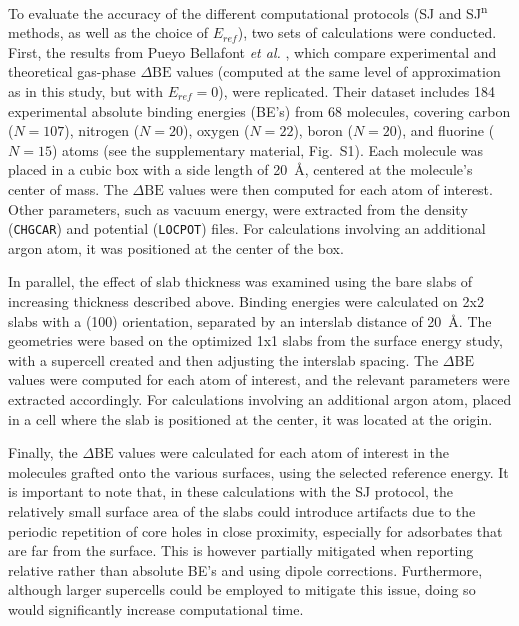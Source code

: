 \documentclass[%
aip,
amsmath,amssymb,
preprint,%
jcp,
showkeys,
]{revtex4-2}
\def\dbe{\ensuremath{\Delta\text{BE}}}
\begin{document}
To evaluate the accuracy of the different computational protocols (SJ and SJ\textsuperscript{n} methods, as well as the choice of $E_{ref}$), two sets of calculations were conducted. First, the results from Pueyo Bellafont \textit{et al.} \cite{pueyobellafontPredictingCoreLevel2017}, which compare experimental and theoretical gas-phase \dbe{} values (computed at the same level of approximation as in this study, but with $E_{ref}=0$), were replicated. Their dataset includes 184 experimental absolute binding energies (BE's) from 68 molecules, covering carbon ($N=107$), nitrogen ($N=20$), oxygen ($N=22$), boron ($N=20$), and fluorine ($N=15$) atoms (see the supplementary material, Fig.~S1). Each molecule was placed in a cubic box with a side length of \SI{20}{\angstrom}, centered at the molecule's center of mass. The \dbe{} values were then computed for each atom of interest. Other parameters, such as vacuum energy, were extracted from the density (\texttt{CHGCAR}) and potential (\texttt{LOCPOT}) files. For calculations involving an additional argon atom, it was positioned at the center of the box.

In parallel, the effect of slab thickness was examined using the bare slabs of increasing thickness described above. Binding energies were calculated on 2x2 slabs with a (100) orientation, separated by an interslab distance of \SI{20}{\angstrom}. The geometries were based on the optimized 1x1 slabs from the surface energy study, with a supercell created and then adjusting the interslab spacing. The \dbe{} values were computed for each atom of interest, and the relevant parameters were extracted accordingly. For calculations involving an additional argon atom, placed in a cell where the slab is positioned at the center, it was located at the origin.

Finally, the \dbe{} values were calculated for each atom of interest in the molecules grafted onto the various surfaces, using the selected reference energy. It is important to note that, in these calculations with the SJ protocol, the relatively small surface area of the slabs could introduce artifacts due to the periodic repetition of core holes in close proximity, especially for adsorbates that are far from the surface.\cite{taucherFinalStateSimulationsCoreLevel2020} This is however partially mitigated when reporting relative rather than absolute BE's and using dipole corrections. Furthermore, although larger supercells could be employed to mitigate this issue, doing so would significantly increase computational time.
\end{document}
